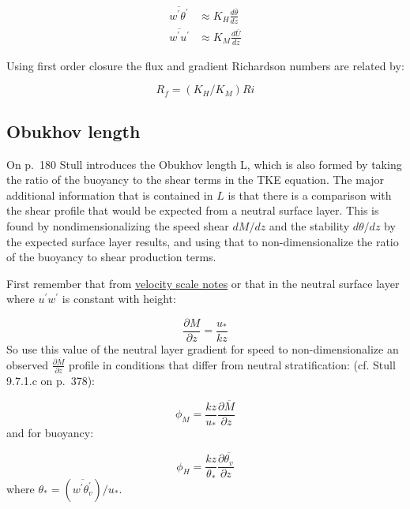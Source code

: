 \documentclass[11pt]{article}
\begin{document}
\begin{eqnarray}
\overline{w^\prime \theta^\prime} &\approx K_H \frac{d\overline{\theta}}{dz}   \\
\overline{w^\prime u^\prime} & \approx K_M \frac{d\overline{U}}{dz}
\end{eqnarray}


Using first order closure the flux and
gradient Richardson numbers are related by:

\begin{equation}
  \label{eq:fluxgrad}
  R_f = (K_H/K_M) Ri
\end{equation}


\subsection{Obukhov length}
\label{sec:obukhov-length}

On p.~180 Stull introduces the Obukhov length L, which is also formed by taking the ratio
of the buoyancy to the shear terms in the TKE equation.  The major additional information
that is contained in $L$ is that there is a comparison with the shear profile that
would be expected from a neutral surface layer.   This is found by nondimensionalizing the
speed shear $dM/dz$ and the stability $d\theta/dz$ by the expected surface layer results, 
and using that to non-dimensionalize the ratio of the buoyancy to shear production terms.

First remember that from 
\href{http://clouds.eos.ubc.ca/~phil/courses/atsc500/docs/velocity_scales.pdf}{velocity scale notes} or
that in the neutral
surface layer where $u^\prime w^\prime$ is constant with height:

\begin{equation}
  \label{eq:shear}
  \frac{ \partial M}{\partial z} = \frac{ u_*}{kz} 
\end{equation}
So use this value of the neutral layer gradient for speed to non-dimensionalize
an observed $\frac{  \partial \overline{ M}  }{\partial z}$ profile in conditions
that differ from neutral stratification: (cf. Stull 9.7.1.c on p.~378):


\begin{equation}
  \label{eq:surface}
\phi_M  =   \frac{kz  }{u_*} \frac{  \partial \overline{ M}  }{\partial z}
\end{equation}
and for buoyancy:

\begin{equation}
  \label{eq:buoyancy}
\phi_H = \frac{k z}{\theta_*}  \frac{\partial  \overline{   \theta_v }    }{\partial z}  
\end{equation}
where $\theta_* =  \left (\overline{ w^\prime \theta_v^\prime } \right )/u_*$.  
\end{document}
